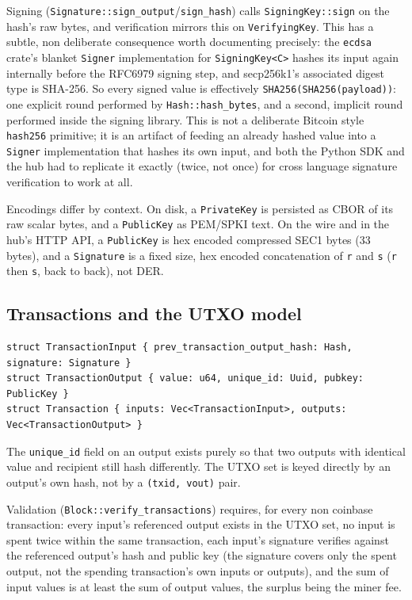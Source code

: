 \documentclass[11pt]{article}
\newcommand{\code}[1]{\texttt{#1}}
\begin{document}
Signing (\code{Signature::sign_output}/\code{sign_hash}) calls \code{SigningKey::sign} on the hash's raw bytes, and verification mirrors this on \code{VerifyingKey}. This has a subtle, non deliberate consequence worth documenting precisely: the \code{ecdsa} crate's blanket \code{Signer} implementation for \code{SigningKey<C>} hashes its input again internally before the RFC6979 signing step, and secp256k1's associated digest type is SHA-256. So every signed value is effectively \code{SHA256(SHA256(payload))}: one explicit round performed by \code{Hash::hash_bytes}, and a second, implicit round performed inside the signing library. This is not a deliberate Bitcoin style \code{hash256} primitive; it is an artifact of feeding an already hashed value into a \code{Signer} implementation that hashes its own input, and both the Python SDK and the hub had to replicate it exactly (twice, not once) for cross language signature verification to work at all.

Encodings differ by context. On disk, a \code{PrivateKey} is persisted as CBOR of its raw scalar bytes, and a \code{PublicKey} as PEM/SPKI text. On the wire and in the hub's HTTP API, a \code{PublicKey} is hex encoded compressed SEC1 bytes (33 bytes), and a \code{Signature} is a fixed size, hex encoded concatenation of \code{r} and \code{s} (\code{r} then \code{s}, back to back), not DER.

\subsection{Transactions and the UTXO model}

\begin{lstlisting}
struct TransactionInput { prev_transaction_output_hash: Hash, signature: Signature }
struct TransactionOutput { value: u64, unique_id: Uuid, pubkey: PublicKey }
struct Transaction { inputs: Vec<TransactionInput>, outputs: Vec<TransactionOutput> }
\end{lstlisting}

The \code{unique_id} field on an output exists purely so that two outputs with identical value and recipient still hash differently. The UTXO set is keyed directly by an output's own hash, not by a \code{(txid, vout)} pair.

Validation (\code{Block::verify_transactions}) requires, for every non coinbase transaction: every input's referenced output exists in the UTXO set, no input is spent twice within the same transaction, each input's signature verifies against the referenced output's hash and public key (the signature covers only the spent output, not the spending transaction's own inputs or outputs), and the sum of input values is at least the sum of output values, the surplus being the miner fee.
\end{document}

